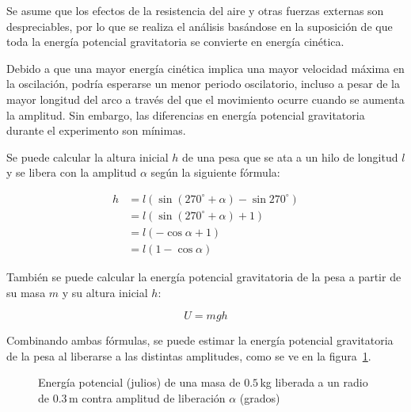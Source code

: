 \documentclass[twocolumn]{report}
\numberwithin{table}{section}
\begin{document}
Se asume que los efectos de la resistencia del aire y otras fuerzas
externas son despreciables, por lo que se realiza el análisis
basándose en la suposición de que toda la energía potencial gravitatoria
se convierte en energía cinética.

Debido a que una mayor energía cinética implica una mayor velocidad
máxima en la oscilación, podría esperarse un menor periodo
oscilatorio, incluso a pesar de la mayor longitud del arco a través
del que el movimiento ocurre cuando se aumenta la amplitud. Sin
embargo, las diferencias en energía potencial gravitatoria durante
el experimento son mínimas.

Se puede calcular la altura inicial $h$ de una pesa que se ata a un hilo de
longitud $l$ y se libera con la amplitud $\alpha$ según la siguiente fórmula:

\begin{align}
  h &= l(\sin{(270^{\circ} + \alpha)} - \sin{270^{\circ}}) \nonumber \\
  &= l(\sin{(270^{\circ} + \alpha)} + 1) \nonumber \\
  &= l(-\cos{\alpha} + 1) \nonumber \\
  &= l(1 - \cos{\alpha})
\end{align}

También se puede calcular la energía potencial gravitatoria de la pesa
a partir de su masa $m$ y su altura inicial $h$:

\begin{equation}
  U = mgh
\end{equation}

Combinando ambas fórmulas, se puede estimar la energía potencial
gravitatoria de la pesa al liberarse a las distintas amplitudes, como
se ve en la figura~\ref{fig:energía_amplitud}.

\begin{figure}[ht]
  \centering
  \caption{Energía potencial (julios) de una masa de $0.5$\,kg
    liberada a un radio de $0.3$\,m contra amplitud de liberación $\alpha$
  (grados)}\label{fig:energía_amplitud}
\end{figure}
\end{document}
